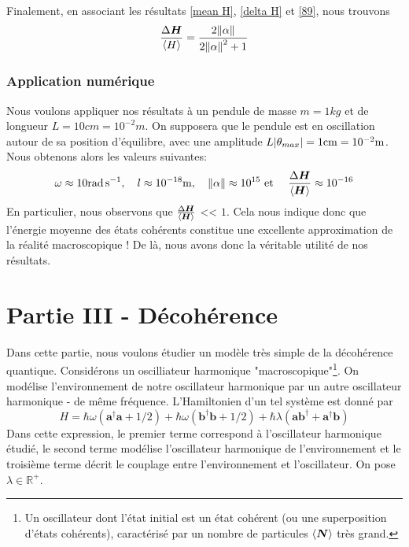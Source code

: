 \documentclass[11pt,oneside,a4paper]{article}
\newcommand{\h}{\ensuremath{\hbar}}
\begin{document}
Finalement, en associant les résultats \eqref{mean H}, \eqref{delta H} et \eqref{89}, nous trouvons
\begin{equation}
  \frac{\Delta \bm{H}}{\expval{H}} = \frac{2\norm{\alpha}}{2\norm{\alpha}^2+1}\label{eq:Delta H/expval H}
\end{equation}
\subsubsection{Application numérique}\label{sec:application numerique}
Nous voulons appliquer nos résultats à un pendule de masse $m=1\si{kg}$ et de longueur $L=10\si{cm} = 10^{-2}\si{m}$. On supposera que le pendule est en oscillation autour de sa position d'équilibre, avec une amplitude $L\absolutevalue{\theta_{max}} = 1\si{cm} = \num{e-2}\unit{\meter}$.\\

Nous obtenons alors les valeurs suivantes: 
\begin{equation*}
  \omega \approx 10\unit{\radian\per\second}, \quad l \approx \num{e-18}\unit{\metre}, \quad \norm{\alpha} \approx \num{e+15} \text{ et } \quad \frac{\Delta\bm{H}}{\expval{\bm{H}}} \approx \num{e-16}
\end{equation*}
En particulier, nous observons que $\frac{\Delta\bm{H}}{\expval{\bm{H}}}$ << $1$. Cela nous indique donc que l'énergie moyenne des états cohérents constitue une excellente approximation de la réalité macroscopique ! De là, nous avons donc la véritable utilité de nos résultats.

\section{Partie III - Décohérence}
\label{partie 3}
Dans cette partie, nous voulons étudier un modèle très simple de la décohérence quantique. Considérons un oscilliateur harmonique "macroscopique"\footnote{Un oscillateur dont l'état initial est un état cohérent (ou une superposition d'états cohérents), caractérisé  par un nombre de particules $\expval{\bm{N}}$ très grand.}. On modélise l'environnement de notre oscillateur harmonique par un autre oscillateur harmonique - de même fréquence. L'Hamiltonien d'un tel système est donné par
\begin{equation}
  \label{eq:Hamiltonien partie III}
  H = \h\omega\left(\bm{a}^\dagger\bm{a}+1/2\right)+\h\omega\left(\bm{b}^\dagger\bm{b}+1/2\right)+\h\lambda\left(\bm{a}\bm{b}^\dagger+\bm{a}^\dagger\bm{b}\right)
\end{equation}
Dans cette expression, le premier terme correspond à l'oscillateur harmonique étudié, le second terme modélise l'oscillateur harmonique de l'environnement et le troisième terme décrit le couplage entre l'environnement et l'oscillateur. On pose $\lambda\in\mathbb{R}^+$.
\end{document}

